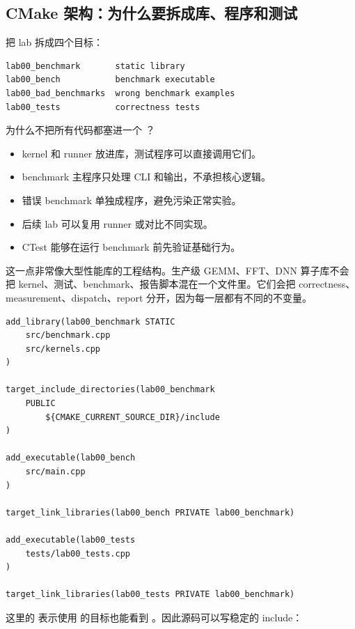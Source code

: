 \subsection{CMake 架构：为什么要拆成库、程序和测试}

 把 lab 拆成四个目标：

\begin{lstlisting}
lab00_benchmark       static library
lab00_bench           benchmark executable
lab00_bad_benchmarks  wrong benchmark examples
lab00_tests           correctness tests
\end{lstlisting}

为什么不把所有代码都塞进一个 ？

\begin{itemize}
  \item kernel 和 runner 放进库，测试程序可以直接调用它们。
  \item benchmark 主程序只处理 CLI 和输出，不承担核心逻辑。
  \item 错误 benchmark 单独成程序，避免污染正常实验。
  \item 后续 lab 可以复用 runner 或对比不同实现。
  \item CTest 能够在运行 benchmark 前先验证基础行为。
\end{itemize}

这一点非常像大型性能库的工程结构。生产级 GEMM、FFT、DNN 算子库不会把 kernel、测试、benchmark、报告脚本混在一个文件里。它们会把 correctness、measurement、dispatch、report 分开，因为每一层都有不同的不变量。

\begin{lstlisting}
add_library(lab00_benchmark STATIC
    src/benchmark.cpp
    src/kernels.cpp
)

target_include_directories(lab00_benchmark
    PUBLIC
        ${CMAKE_CURRENT_SOURCE_DIR}/include
)

add_executable(lab00_bench
    src/main.cpp
)

target_link_libraries(lab00_bench PRIVATE lab00_benchmark)

add_executable(lab00_tests
    tests/lab00_tests.cpp
)

target_link_libraries(lab00_tests PRIVATE lab00_benchmark)
\end{lstlisting}

这里的  表示使用  的目标也能看到 。因此源码可以写稳定的 include：

